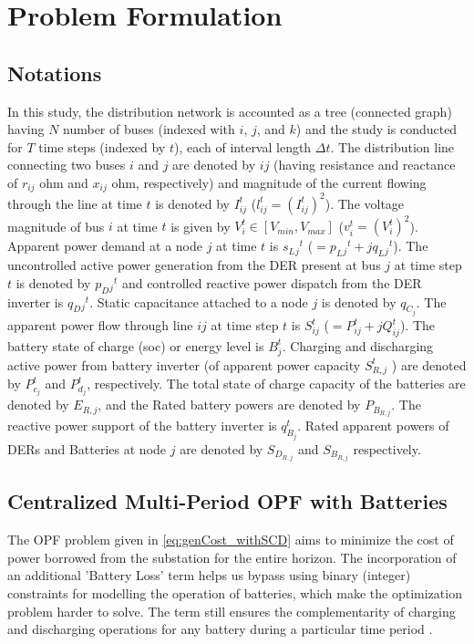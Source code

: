 \documentclass[../../outputs/main.tex]{subfiles}
\begin{document}
\section{Problem Formulation}

\subsection{Notations}
In this study, the distribution network is accounted as a tree (connected graph) having \(N\) number of buses (indexed with \(i\), \(j\), and \(k\)) and the study is conducted for \(T\) time steps (indexed by \(t\)), each of interval length $\Delta t$. The distribution line connecting two buses \(i\) and \(j\) are denoted by {\(ij\)} (having resistance and reactance of \(r_{ij}\) ohm and \(x_{ij}\) ohm, respectively) and magnitude of the current flowing through the line at time \(t\) is denoted by \(I_{ij}^t\) (\(l_{ij}^t=\left(I_{ij}^t\right)^2\)). The voltage magnitude of bus \(i\) at time \(t\) is given by \(V_i^t \in [V_{min},V_{max}]\) (\(v_i^t=\left(V_i^t\right)^2\)). Apparent power demand at a node \(j\) at time \(t\) is \(s_L{_j}^t\) (\(=p_L{_j}^t+\textit{j}q_L{_j}^t\)). The uncontrolled active power generation from the DER present at bus \(j\) at time step \(t\) is denoted by \(p_D{_j}^t\) and controlled reactive power dispatch from the DER inverter is \(q_D{_j}^t\). Static capacitance attached to a node $j$ is denoted by $q_{C_{j}}$. The apparent power flow through line {\(ij\)} at time step \(t\) is \(S_{ij}^t\) (\(=P_{ij}^t+\textit{j}Q_{ij}^t\)). The battery state of charge (soc) or energy level is \(B_j^t\). Charging and discharging active power from battery inverter (of apparent power capacity \(S^{t}_{R, j}\) ) are denoted by \(P_{c_j}^t\) and \(P_{d_j}^t\), respectively. The total state of charge capacity of the batteries are denoted by $E_{R, j}$, and the Rated battery powers are denoted by $P_{B_{R, j}}$. The reactive power support of the battery inverter is \(q_{B_j}^t\). Rated apparent powers of DERs and Batteries at node $j$ are denoted by $S_{D_{R, j}}$ and $S_{B_{R, j}}$ respectively.

\subsection{Centralized Multi-Period OPF with Batteries}
The OPF problem given in \cref{eq:genCost_withSCD} aims to minimize the cost of power borrowed from the substation for the entire horizon. The incorporation of an additional 'Battery Loss' term helps us bypass using binary (integer) constraints for modelling the operation of batteries, which make the optimization problem harder to solve. The term still ensures the complementarity of charging and discharging operations for any battery during a particular time period \cite{Nazir2018Jun, Nazir2019Jun, Nazir2021Sep}.
\end{document}
